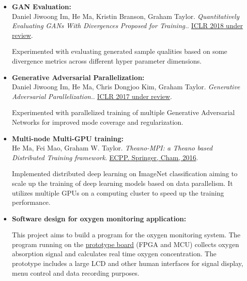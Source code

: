 \documentclass[11pt,a4paper,sans]{moderncv}        %
\begin{document}
				\begin{itemize}
					\item{\textbf{GAN Evaluation:} \\ Daniel Jiwoong Im, He Ma, Kristin Branson, Graham Taylor. \textit{Quantitatively Evaluating GANs With Divergences Proposed for Training.}. \href{https://openreview.net/forum?id=SJQHjzZ0-}{ICLR 2018 under review}.
						
						\vspace{3pt}
						
						Experimented with evaluating generated sample qualities based on some divergence metrics across different hyper parameter dimensions.}
					
					\vspace{6pt}
					
					\item{\textbf{Generative Adversarial Parallelization:} \\ Daniel Jiwoong Im, He Ma, Chris Dongjoo Kim, Graham Taylor. \textit{Generative Adversarial Parallelization.}. \href{https://openreview.net/pdf?id=Sk8J83oee}{ICLR 2017 under review}.
						
						\vspace{3pt}
						
						Experimented with parallelized training of multiple Generative Adversarial Networks for improved mode coverage and regularization.}
					
					\vspace{6pt}
					
					\item{\textbf{Multi-node Multi-GPU training:} \\ He Ma, Fei Mao, Graham W. Taylor. \textit{Theano-MPI: a Theano based Distributed Training framework}. \href{https://link.springer.com/chapter/10.1007/978-3-319-58943-5_64}{ECPP. Springer, Cham, 2016}.
						
						\vspace{3pt}
						
						Implemented distributed deep learning on ImageNet classification aiming to scale up the training of deep learning models based on data parallelism. It utilizes multiple GPUs on a computing cluster to speed up the training performance.}
					
					\vspace{6pt}
					
					\item{\textbf{Software design for oxygen monitoring application:}
						
						\vspace{3pt}
						
						This project aims to build a program for the oxygen monitoring system. The program running on the \href{https://hma02.github.io/AllanMa/index.html#oxygen}{prototype board} (FPGA and MCU) collects oxygen absorption signal and calculates real time oxygen concentration. The prototype includes a large LCD and other human interfaces for signal display, menu control and data recording purposes.}
				\end{itemize}
				
\end{document}

